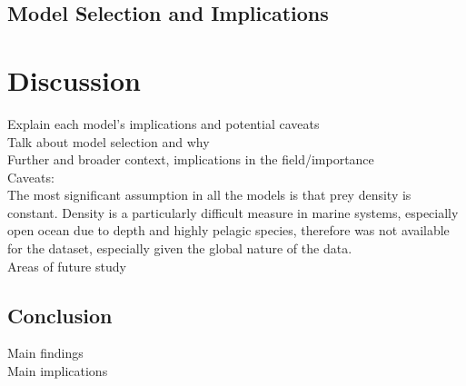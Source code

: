 \documentclass[11pt,a4paper,titlepage]{article}
\begin{document}
	\subsection{Model Selection and Implications}
	
	\section{Discussion}
	
	Explain each model's implications and potential caveats\\
	
	Talk about model selection and why\\
		
	Further and broader context, implications in the field/importance\\
	
	Caveats:\\
	The most significant assumption in all the models is that prey density is constant. Density is a particularly difficult measure in marine systems, especially open ocean due to depth and highly pelagic species, therefore was not available for the dataset, especially given the global nature of the data.\\
	
	Areas of future study\\
	
	\subsection{Conclusion}	
	
	Main findings\\
	Main implications\\
	
	
	
	
	
\end{document}
